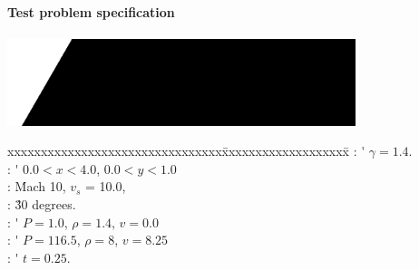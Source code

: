 \NEWSEC

\subsection{\ssDoubleMach}

\begin{frame}[fragile,label=ss-doublemach] 
\secframetitle{\ssDoubleMach}
\framesubtitle{Test problem specification}

\footnotesize
\begin{center}
\includegraphics[width=4.0in]{Images/DoubleMachAmr/doublemach-de-0000.png}
\end{center}

\begin{tabbing}
xxxxxxxxxxxxxxxxxxxxxxxxxxxxxxxx\=xxxxxxxxxxxxxxxxxxx\=\kill
\> : \' $\gamma = 1.4$. \\
\> : \' $0.0 < x < 4.0$, $0.0 < y < 1.0$ \\
\> : \' Mach 10, $v_s$ = 10.0, \\
\> : \' 30 degrees. \\
\> : \' $P = 1.0$, $\rho = 1.4$, $v = 0.0$ \\
\> : \' $P = 116.5$, $\rho = 8$, $v = 8.25$ \\
\> : \' $t = 0.25$.
\end{tabbing}
\end{frame}


